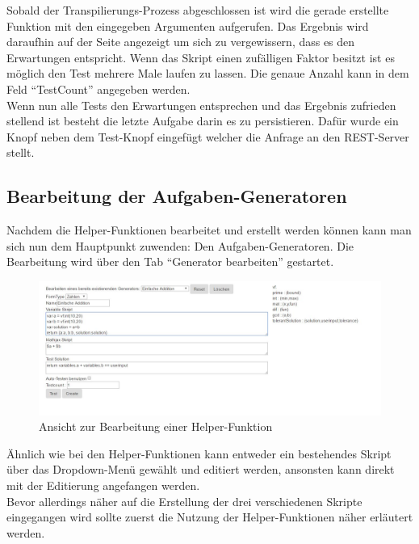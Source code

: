 Sobald der Transpilierungs-Prozess abgeschlossen ist wird die gerade erstellte Funktion mit den eingegeben Argumenten aufgerufen. Das Ergebnis wird daraufhin auf der Seite angezeigt um sich zu vergewissern, dass es den Erwartungen entspricht.  Wenn das Skript einen zufälligen Faktor besitzt ist es möglich den Test mehrere Male laufen zu lassen. Die genaue Anzahl kann in dem Feld ``TestCount'' angegeben werden. \\

Wenn nun alle Tests den Erwartungen entsprechen und das Ergebnis zufrieden stellend ist besteht die letzte Aufgabe darin es zu persistieren. Dafür wurde ein Knopf neben dem Test-Knopf eingefügt welcher die Anfrage an den REST-Server stellt. \\

\subsection{Bearbeitung der Aufgaben-Generatoren}

Nachdem die Helper-Funktionen bearbeitet und erstellt werden können kann man sich nun dem Hauptpunkt zuwenden: Den Aufgaben-Generatoren. Die Bearbeitung wird über den Tab ``Generator bearbeiten'' gestartet. \\

\begin{figure}[htp]     %
\centering
\includegraphics[width=1\textwidth]{bilder/EditScript} 
\caption[Ansicht zur Bearbeitung einer Helper-Funktion]{Ansicht zur Bearbeitung einer Helper-Funktion}
\end{figure} 

Ähnlich wie bei den Helper-Funktionen kann entweder ein bestehendes Skript über das Dropdown-Menü gewählt und editiert werden, ansonsten kann direkt mit der Editierung angefangen werden. \\

Bevor allerdings näher auf die Erstellung der drei verschiedenen Skripte eingegangen wird sollte zuerst die Nutzung der Helper-Funktionen näher erläutert werden. \\

